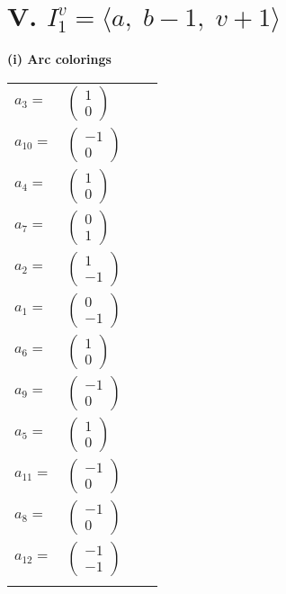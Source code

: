 \documentclass[1p]{elsarticle_modified}
\theoremstyle{definition}
\begin{document}
\centering \section*{V. $I^v_{1}= \langle a,\;b-1,\;v+1 \rangle$}
\flushleft \textbf{(i) Arc colorings}\\
\begin{tabular}{m{7pt} m{180pt} m{7pt} m{180pt} }
\flushright $a_{3}=$&$\begin{pmatrix}1\\0\end{pmatrix}$ \\
\flushright $a_{10}=$&$\begin{pmatrix}-1\\0\end{pmatrix}$ \\
\flushright $a_{4}=$&$\begin{pmatrix}1\\0\end{pmatrix}$ \\
\flushright $a_{7}=$&$\begin{pmatrix}0\\1\end{pmatrix}$ \\
\flushright $a_{2}=$&$\begin{pmatrix}1\\-1\end{pmatrix}$ \\
\flushright $a_{1}=$&$\begin{pmatrix}0\\-1\end{pmatrix}$ \\
\flushright $a_{6}=$&$\begin{pmatrix}1\\0\end{pmatrix}$ \\
\flushright $a_{9}=$&$\begin{pmatrix}-1\\0\end{pmatrix}$ \\
\flushright $a_{5}=$&$\begin{pmatrix}1\\0\end{pmatrix}$ \\
\flushright $a_{11}=$&$\begin{pmatrix}-1\\0\end{pmatrix}$ \\
\flushright $a_{8}=$&$\begin{pmatrix}-1\\0\end{pmatrix}$ \\
\flushright $a_{12}=$&$\begin{pmatrix}-1\\-1\end{pmatrix}$\\&\end{tabular}
\end{document}
